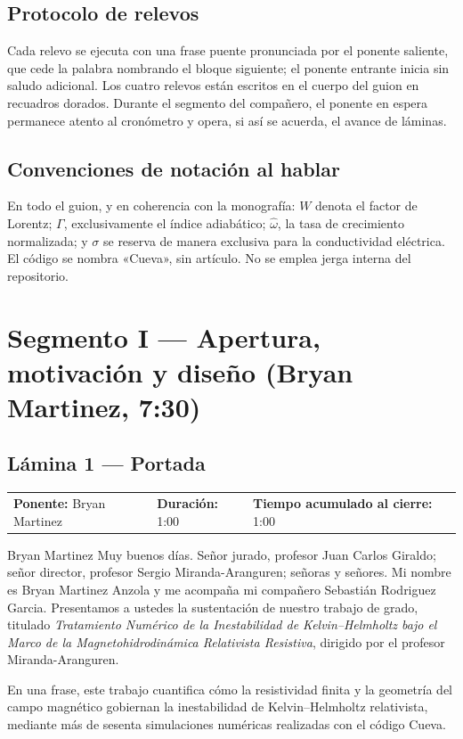 \documentclass[11pt,letterpaper]{article}
\makeatletter
\newcommand{\lamina}[5]{%
  \subsection*{Lámina #1 --- #2}
  \noindent
  \begin{tabular}{@{}llll@{}}
    \textbf{Ponente:} #3 &\quad \textbf{Duración:} #4 &\quad
    \textbf{Tiempo acumulado al cierre:} #5 &
  \end{tabular}
  \vspace{2pt}}
\makeatother
\begin{document}
\subsection{Protocolo de relevos}
Cada relevo se ejecuta con una frase puente pronunciada por el ponente
saliente, que cede la palabra nombrando el bloque siguiente; el ponente
entrante inicia sin saludo adicional. Los cuatro relevos están escritos en
el cuerpo del guion en recuadros dorados. Durante el segmento del compañero,
el ponente en espera permanece atento al cronómetro y opera, si así se
acuerda, el avance de láminas.

\subsection{Convenciones de notación al hablar}
En todo el guion, y en coherencia con la monografía: $W$ denota el factor de
Lorentz; $\Gamma$, exclusivamente el índice adiabático; $\hat\omega$, la tasa
de crecimiento normalizada; y $\sigma$ se reserva de manera exclusiva para la
conductividad eléctrica. El código se nombra «Cueva», sin artículo. No se
emplea jerga interna del repositorio.

\section{Segmento I --- Apertura, motivación y diseño (Bryan Martinez, 7:30)}

\lamina{1}{Portada}{Bryan Martinez}{1:00}{1:00}

\begin{parlamento}{Bryan Martinez}
Muy buenos días. Señor jurado, profesor Juan Carlos Giraldo; señor director,
profesor Sergio Miranda-Aranguren; señoras y señores. Mi nombre es Bryan
Martinez Anzola y me acompaña mi compañero Sebastián Rodriguez Garcia. Presentamos
a ustedes la sustentación de nuestro trabajo de grado, titulado
\emph{Tratamiento Numérico de la Inestabilidad de Kelvin--Helmholtz bajo el
Marco de la Magnetohidrodinámica Relativista Resistiva}, dirigido por el
profesor Miranda-Aranguren.

En una frase, este trabajo cuantifica cómo la resistividad finita y la
geometría del campo magnético gobiernan la inestabilidad de
Kelvin--Helmholtz relativista, mediante más de sesenta simulaciones
numéricas realizadas con el código Cueva.
\end{parlamento}
\end{document}
